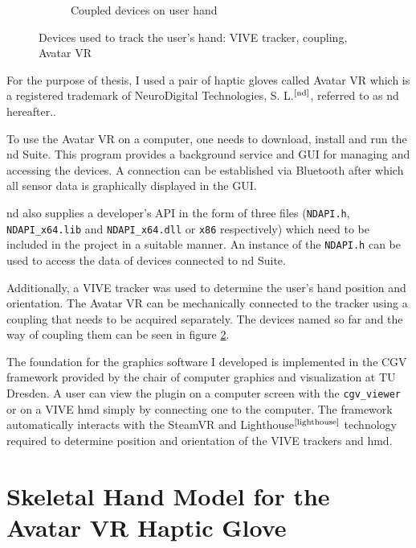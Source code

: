 \documentclass[hyperref, bachelorofscience]{cgvpub}
\newcommand{\newcite}[1]{$ ^{\text{\cite{#1}}} $}
\begin{document}
\begin{figure}
\begin{subfigure}{.49\linewidth}
		\caption{Coupled devices on user hand}
		\label{fig:devices:cou}
	\end{subfigure}
	\caption[Devices used to track the user's hand]{Devices used to track the user's hand: \Gls{VIVE} tracker, coupling, Avatar VR}
	\label{fig:devices}
\end{figure}

For the purpose of thesis, I used a pair of haptic gloves called Avatar VR which is a registered trademark of NeuroDigital Technologies, S. L.\newcite{nd}, referred to as \acrshort{nd} hereafter..

To use the Avatar VR on a computer, one needs to download, install and run the \acrshort{nd} Suite. This program provides a background service and GUI for managing and accessing the devices. A connection can be established via Bluetooth after which all sensor data is graphically displayed in the GUI.

\acrshort{nd} also supplies a developer's API in the form of three files (\lstinline|NDAPI.h|, \lstinline|NDAPI_x64.lib| and \lstinline|NDAPI_x64.dll| or \lstinline|x86| respectively) which need to be included in the project in a suitable manner. An instance of the \lstinline|NDAPI.h| can be used to access the data of devices connected to \acrshort{nd} Suite.

Additionally, a \Gls{VIVE} tracker was used to determine the user's hand position and orientation. The Avatar VR can be mechanically connected to the tracker using a coupling that needs to be acquired separately. The devices named so far and the way of coupling them can be seen in figure \ref{fig:devices}.

The foundation for the graphics software I developed is implemented in the \gls{CGV} framework provided by the chair of computer graphics and visualization at TU Dresden. A user can view the plugin on a computer screen with the \lstinline|cgv_viewer| or on a \Gls{VIVE} \acrfull{hmd} simply by connecting one to the computer. The framework automatically interacts with the SteamVR and Lighthouse\newcite{lighthouse} technology required to determine position and orientation of the \Gls{VIVE} trackers and \acrshort{hmd}.

\section{Skeletal Hand Model for the Avatar VR Haptic Glove} \label{sec:hand_model}
\end{document}
